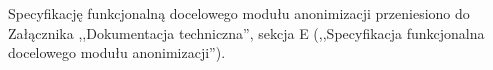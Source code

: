 
Specyfikację funkcjonalną docelowego modułu anonimizacji przeniesiono do Załącznika ,,Dokumentacja techniczna'', sekcja E (,,Specyfikacja funkcjonalna docelowego modułu anonimizacji'').
